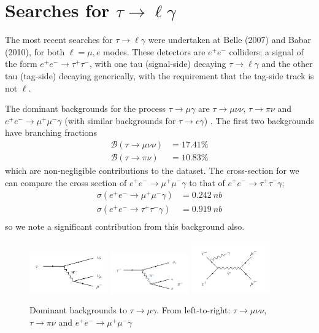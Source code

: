 \documentclass[12pt]{thesis}  %
\newcommand{\br}{\mathcal{B}}
\newcommand{\tmg}{\tau\to\mu\gamma}
\newcommand{\tlg}{\tau\to\ell\gamma}
\begin{document}
\section{Searches for $\tlg$}

The most recent searches for $\tlg$ were undertaken at Belle (2007) and Babar (2010), for both $\ell=\mu,e$ modes. These detectors are $e^+ e^-$ colliders; a signal of the form $e^+ e^-\to \tau^+ \tau^-$, with one tau (signal-side) decaying $\tau\to \ell \gamma$ and the other tau (tag-side) decaying generically, with the requirement that the tag-side track is not $\ell$.

The dominant backgrounds for the process $\tmg$ are $\tau\to \mu \nu \nu$, $\tau\to \pi \nu$ and $e^+ e^- \to \mu^+ \mu^- \gamma$ (with similar backgrounds for $\tau\to e \gamma$) \cite{Hayasaka:2007}. The first two backgrounds have branching fractions
\begin{align}
\br(\tau\to \mu \nu \nu)&=17.41\%\\
\br(\tau\to\pi\nu)&=10.83\%
\end{align}
which are non-negligible contributions to the dataset. The cross-section for we can compare the cross section of $e^+ e^- \to \mu^+ \mu^- \gamma$ to that of $e^+ e^- \to \tau^+ \tau^- \gamma$;
\begin{align}
\sigma(e^+ e^- \to \mu^+ \mu^- \gamma)&=\SI{0.242}{nb}\\
\sigma(e^+ e^- \to \tau^+ \tau^- \gamma)&=\SI{0.919}{nb}\\
\end{align}
so we note a significant contribution from this background also.

\begin{figure}[h]
\centering
\includegraphics[width=0.3\textwidth]{images/taumununu.png}
\includegraphics[width=0.3\textwidth]{images/taupinu.png}
\includegraphics[width=0.3\textwidth]{images/eemumugamma.png}
\caption{Dominant backgrounds to $\tmg$. From left-to-right: $\tau\to \mu \nu \nu$, $\tau\to \pi \nu$ and $e^+ e^- \to \mu^+ \mu^- \gamma$}
\end{figure}
\end{document}
